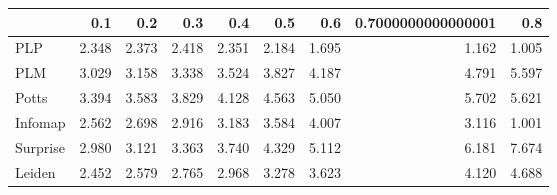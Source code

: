 \begin{tabular}{lrrrrrrrr}
\toprule
{} &   0.1 &   0.2 &   0.3 &   0.4 &   0.5 &   0.6 & 0.7000000000000001 &   0.8 \\
\midrule
PLP      & 2.348 & 2.373 & 2.418 & 2.351 & 2.184 & 1.695 &              1.162 & 1.005 \\
PLM      & 3.029 & 3.158 & 3.338 & 3.524 & 3.827 & 4.187 &              4.791 & 5.597 \\
Potts    & 3.394 & 3.583 & 3.829 & 4.128 & 4.563 & 5.050 &              5.702 & 5.621 \\
Infomap  & 2.562 & 2.698 & 2.916 & 3.183 & 3.584 & 4.007 &              3.116 & 1.001 \\
Surprise & 2.980 & 3.121 & 3.363 & 3.740 & 4.329 & 5.112 &              6.181 & 7.674 \\
Leiden   & 2.452 & 2.579 & 2.765 & 2.968 & 3.278 & 3.623 &              4.120 & 4.688 \\
\bottomrule
\end{tabular}
